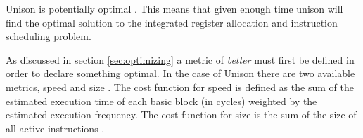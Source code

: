 Unison is potentially optimal \cite{reg-alloc-inst-sched-uni, unison-docs}. This means that
given enough time unison will find the optimal solution to the integrated register allocation
and instruction scheduling problem.

As discussed in section \ref{sec:optimizing} a metric of \textit{better} must first be
defined in order to declare something optimal. In the case of Unison there are two available
metrics, speed and size \cite{unison-docs,reg-alloc-inst-sched-uni}. The cost function for speed
is defined as the sum of the estimated execution time of each basic block (in cycles)
weighted by the estimated execution frequency. The cost function for size is the sum of
the size of all active instructions \cite[Section~3]{reg-alloc-inst-sched-uni}.
